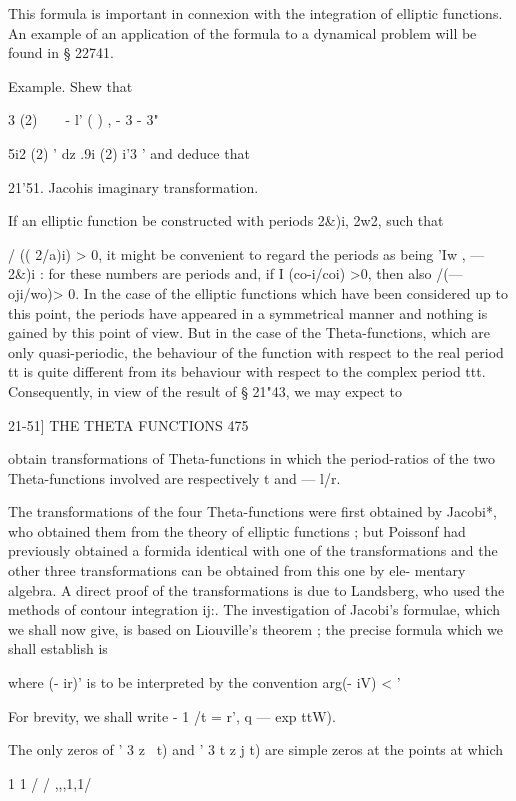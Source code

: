 This formula is important in connexion with the integration of elliptic 
functions. An example of an application of the formula to a dynamical 
problem will be found in § 22741. 

Example. Shew that 

  3  (2)\  \  \ \     - l' ( ) , - 3 - 3" 

5i2 (2) '    dz .9i (2)  i'3 ' 
and deduce that 

21'51. Jacohis imaginary transformation. 

If an elliptic function be constructed with periods 2\&)i, 2w2, such that 

/ (( 2/a)i) > 0, 
it might be convenient to regard the periods as being 'Iw , — 2\&)i : for these 
numbers are periods and, if I (co-i/coi) >0, then also /(— oji/wo)> 0. In the 
case of the elliptic functions which have been considered up to this point, 
the periods have appeared in a symmetrical manner and nothing is gained 
by this point of view. But in the case of the Theta-functions, which are 
only quasi-periodic, the behaviour of the function with respect to the real 
period tt is quite different from its behaviour with respect to the complex 
period ttt. Consequently, in view of the result of § 21"43, we may expect to 



21-51] THE THETA FUNCTIONS 475 

obtain transformations of Theta-functions in which the period-ratios of the 
two Theta-functions involved are respectively t and — l/r. 

The transformations of the four Theta-functions were first obtained by 
Jacobi*, who obtained them from the theory of elliptic functions ; but Poissonf 
had previously obtained a formida identical with one of the transformations 
and the other three transformations can be obtained from this one by ele- 
mentary algebra. A direct proof of the transformations is due to Landsberg, 
who used the methods of contour integration ij:. The investigation of Jacobi's 
formulae, which we shall now give, is based on Liouville's theorem ; the precise 
formula which we shall establish is 

where (- ir)'   is to be interpreted by the convention arg(- iV) <  '  

For brevity, we shall write - 1 /t = r', q — exp  ttW). 

The only zeros of ' 3  z \ t) and ' 3  t z j t) are simple zeros at the points 
at which 

1 1 / / ,,,1,1/ 

